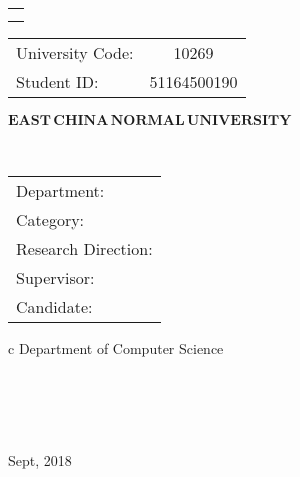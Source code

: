 

\pagestyle{empty}

\begin{flushleft}
	\footnotesize
	\begin{tabular}{l}
		\noindent{ Dissertation for master degree in 2019}  \\ 
		\noindent{  (Professional)}\\ 
	\end{tabular}
\hspace{104pt} 
	\begin{tabular}{lc}
	 University Code:  &  10269  \\ 
 Student ID: &    51164500190  \\ 
	\end{tabular}
\end{flushleft}

\vskip 2cm

\begin{center}
{\Huge $\mathbf{EAST}\,\mathbf{CHINA}\,\mathbf{NORMAL}\,
\mathbf{UNIVERSITY}$}
\end{center}

\vskip 3cm

\begin{center}
\bfseries{\scshape{\huge \TheisNameEn
}}\\
\end{center}

\vskip 3.5cm {\large
\begin{center}
\begin{tabular}{l}
Department:\\
Category:\\ 
Research Direction:\\
Supervisor:\\
Candidate:
\end{tabular}
\begin{tabular}c
\normalsize{{Department of Computer Science}}\\
\hline ~~~  \\
\hline ~~~\\
\hline ~~~ \\
\hline ~~~  \\

\hline
\end{tabular}
\end{center}}

\vskip 30mm

\begin{center}
{\Large Sept, 2018}
\end{center}
